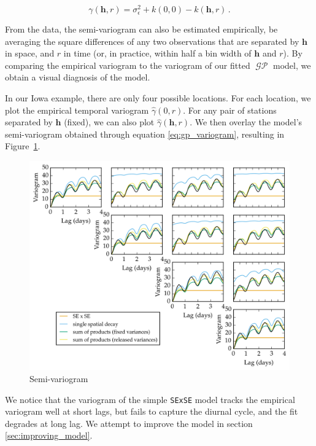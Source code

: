 \documentclass[letter]{article}
\makeatletter
\def\maxwidth{\ifdim\Gin@nat@width>\linewidth\linewidth
\else\Gin@nat@width\fi}
\let\Oldincludegraphics\includegraphics
\renewcommand{\includegraphics}[1]{\Oldincludegraphics[width=0.98\maxwidth]{#1}}
\newcommand{\genericdel}[3]{%
      \left#1#3\right#2
    }
\newcommand{\del}[1]{\genericdel(){#1}}
\DeclareMathOperator{\GP}{\mathcal{GP}}
\newcommand{\hvec}{\mathbold{h}}
\newcommand{\sigman}{\sigma_{\epsilon}}
\makeatother
\begin{document}
\begin{equation}
    \label{eq:gp_variogram}
    \gamma\del{\hvec,r} = \sigman^2 + k\del{0,0} - k(\hvec,r)\,.
\end{equation}

From the data, the semi-variogram can also be estimated empirically, be averaging the square differences of any two observations that are separated by \(\hvec\) in space, and \(r\) in time (or, in practice, within half a bin width of \(\hvec\) and \(r\)). By comparing the empirical variogram to the variogram of our fitted \(\GP\) model, we obtain a visual diagnosis of the model.

In our Iowa example, there are only four possible locations. For each location, we plot the empirical temporal variogram \(\hat\gamma\del{0,r}\). For any pair of stations separated by \(\hvec\) (fixed), we can also plot \(\hat\gamma\del{\hvec,r}\). We then overlay the model's semi-variogram obtained through equation \eqref{eq:gp_variogram}, resulting in Figure~\ref{fig:spatial_variogram}.

\begin{figure}
\centering
\includegraphics{../figures/spatial_variogram.png}
\caption{\label{fig:spatial_variogram} Semi-variogram}
\end{figure}
    


        We notice that the variogram of the simple \texttt{SExSE} model tracks the empirical variogram well at short lags, but fails to capture the diurnal cycle, and the fit degrades at long lag. We attempt to improve the model in section \ref{sec:improving_model}.
    
\end{document}
